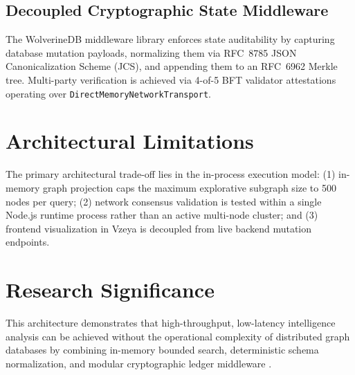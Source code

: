 \subsection{Decoupled Cryptographic State Middleware}
The WolverineDB middleware library enforces state auditability by capturing database mutation payloads, normalizing them via RFC~8785 JSON Canonicalization Scheme (JCS), and appending them to an RFC~6962 Merkle tree. Multi-party verification is achieved via 4-of-5 BFT validator attestations operating over \texttt{DirectMemoryNetworkTransport}.

\section{Architectural Limitations}
\label{sec:arch_limitations}

The primary architectural trade-off lies in the in-process execution model: (1) in-memory graph projection caps the maximum explorative subgraph size to 500 nodes per query; (2) network consensus validation is tested within a single Node.js runtime process rather than an active multi-node cluster; and (3) frontend visualization in Vzeya is decoupled from live backend mutation endpoints.

\section{Research Significance}
\label{sec:arch_significance}

This architecture demonstrates that high-throughput, low-latency intelligence analysis can be achieved without the operational complexity of distributed graph databases by combining in-memory bounded search, deterministic schema normalization, and modular cryptographic ledger middleware \cite{kleppmann2017designing, cormen2009introduction}.
